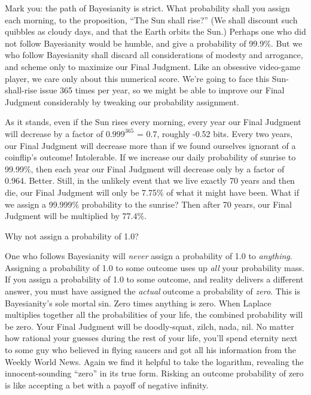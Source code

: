 {
 Mark you: the path of Bayesianity is strict. What probability
shall you assign each morning, to the proposition,
``The Sun shall rise?'' (We shall
discount such quibbles as cloudy days, and that the Earth orbits the
Sun.) Perhaps one who did not follow Bayesianity would be humble, and
give a probability of 99.9\%. But we who follow Bayesianity shall
discard all considerations of modesty and arrogance, and scheme only to
maximize our Final Judgment. Like an obsessive video-game player, we
care only about this numerical score. We're going to
face this Sun-shall-rise issue 365 times per year, so we might be able
to improve our Final Judgment considerably by tweaking our probability
assignment.}

{
 As it stands, even if the Sun rises every morning, every year our
Final Judgment will decrease by a factor of $0.999^{365}$
= 0.7, roughly -0.52 bits. Every two years, our Final Judgment will
decrease more than if we found ourselves ignorant of a
coinflip's outcome! Intolerable. If we increase our
daily probability of sunrise to 99.99\%, then each year our Final
Judgment will decrease only by a factor of 0.964. Better. Still, in the
unlikely event that we live exactly 70 years and then die, our Final
Judgment will only be 7.75\% of what it might have been. What if we
assign a 99.999\% probability to the sunrise? Then after 70 years, our
Final Judgment will be multiplied by 77.4\%.}

{
 Why not assign a probability of 1.0?}

{
 One who follows Bayesianity will \textit{never} assign a
probability of 1.0 to \textit{anything}. Assigning a probability of 1.0
to some outcome uses up \textit{all} your probability mass. If you
assign a probability of 1.0 to some outcome, and reality delivers a
different answer, you must have assigned the \textit{actual} outcome a
probability of \textit{zero}. This is Bayesianity's
sole mortal sin. Zero times anything is zero. When Laplace multiplies
together all the probabilities of your life, the combined probability
will be zero. Your Final Judgment will be doodly-squat, zilch, nada,
nil. No matter how rational your guesses during the rest of your life,
you'll spend eternity next to some guy who believed in
flying saucers and got all his information from the Weekly World News.
Again we find it helpful to take the logarithm, revealing the
innocent-sounding ``zero'' in its
true form. Risking an outcome probability of zero is like accepting a
bet with a payoff of negative infinity.}

